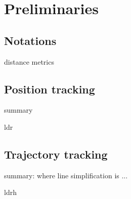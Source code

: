 



\section{Preliminaries}
\label{sec-pre}

\subsection{Notations}
distance metrics

\subsection{Position tracking}
summary

ldr

\subsection{Trajectory tracking}
summary: 
where line simplification is ...

ldrh




